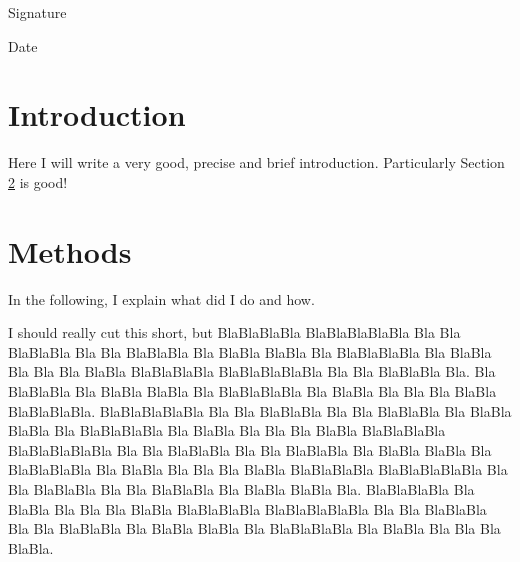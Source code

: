 \documentclass[
  11pt,
  twoside,
  11pt]{article}
\numberwithin{Theorem}{section}
\numberwithin{Definition}{section}
\numberwithin{Lemma}{section}
\numberwithin{Algorithm}{section}
\numberwithin{equation}{section}
\newcommand{\dottedline}[1]{\makebox[#1]{.\dotfill}}
\begin{document}
\vspace{1cm}

Signature \dottedline{8cm}


\vspace{5mm}

Date \dottedline{8cm}


\clearpage



\pagestyle{plain}
\setcounter{page}{1}
\tableofcontents
\clearpage
\listoftables
\listoffigures
\cleardoublepage

\setcounter{page}{1}

\nocite{*}

\clearpage

\section{Introduction}
\label{sec:intro}

Here I will write a very good, precise and brief introduction.
Particularly Section \ref{sec:methods} is good!
\clearpage

\section{Methods}
\label{sec:methods}
In the following, I explain what did I do and how.

I should really cut this short, but BlaBlaBlaBla BlaBlaBlaBlaBla Bla Bla BlaBlaBla Bla Bla BlaBlaBla Bla BlaBla BlaBla Bla BlaBlaBlaBla Bla BlaBla Bla Bla Bla BlaBla BlaBlaBlaBla BlaBlaBlaBlaBla Bla Bla BlaBlaBla Bla. Bla BlaBlaBla Bla BlaBla BlaBla Bla BlaBlaBlaBla Bla BlaBla Bla Bla Bla BlaBla BlaBlaBlaBla. BlaBlaBlaBlaBla Bla Bla BlaBlaBla Bla Bla BlaBlaBla Bla BlaBla BlaBla Bla BlaBlaBlaBla Bla BlaBla Bla Bla Bla BlaBla BlaBlaBlaBla BlaBlaBlaBlaBla Bla Bla BlaBlaBla Bla Bla BlaBlaBla Bla BlaBla BlaBla Bla BlaBlaBlaBla Bla BlaBla Bla Bla Bla BlaBla BlaBlaBlaBla BlaBlaBlaBlaBla Bla Bla BlaBlaBla Bla Bla BlaBlaBla Bla BlaBla BlaBla Bla. BlaBlaBlaBla Bla BlaBla Bla Bla Bla BlaBla BlaBlaBlaBla BlaBlaBlaBlaBla Bla Bla BlaBlaBla Bla Bla BlaBlaBla Bla BlaBla BlaBla Bla BlaBlaBlaBla Bla BlaBla Bla Bla Bla BlaBla.
\end{document}
